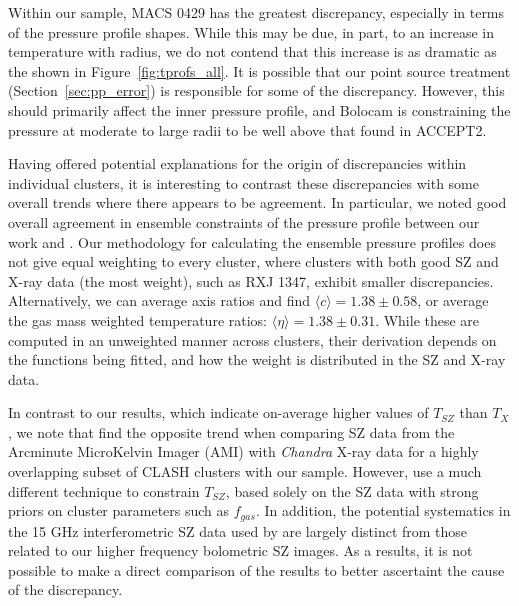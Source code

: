 \documentclass[iop,numberedappendix,apj]{emulateapj}
\begin{document}
Within our sample, MACS 0429 has the greatest discrepancy, especially in terms of the pressure profile shapes. While
this may be due, in part, to an increase in temperature with radius, we do not contend that this increase is as dramatic
as the shown in Figure~\ref{fig:tprofs_all}.
It is possible that our point source treatment (Section~\ref{sec:pp_error}) is responsible for some of the discrepancy. 
However, this should primarily affect the inner pressure profile, and Bolocam is constraining the pressure at moderate 
to large radii to be well above that found in ACCEPT2. 

Having offered potential explanations for the origin of discrepancies within individual clusters, it is interesting to
contrast these discrepancies with some overall trends where there appears to be agreement. In particular, we noted good 
overall agreement in ensemble constraints of the pressure profile between our work and . Our
methodology for calculating the ensemble pressure profiles does not give equal weighting to every cluster, where clusters
with both good SZ and X-ray data (the most weight), such as RXJ 1347, exhibit smaller discrepancies. Alternatively,
we can average axis ratios and find $\langle c \rangle = 1.38 \pm 0.58$, or average the gas mass weighted temperature 
ratios: $\langle \eta \rangle = 1.38 \pm 0.31$. While these are computed in an unweighted manner across clusters, their
derivation depends on the functions being fitted, and how the weight is distributed in the SZ and X-ray data. 

In contrast to our results, which indicate on-average higher values of $T_{SZ}$ than $T_{X}$, we note that \citet{rumsey2016}
find the opposite trend when comparing SZ data from the Arcminute MicroKelvin Imager (AMI) with \emph{Chandra} X-ray data for
a highly overlapping subset of CLASH clusters with our sample. However, \citet{rumsey2016} use a much different technique to
constrain $T_{SZ}$, based solely on the SZ data with strong priors on cluster parameters such as $f_{gas}$. In addition, the 
potential systematics in the 15 GHz interferometric SZ data used by \citet{rumsey2016} are largely distinct from those
related to our higher frequency bolometric SZ images. As a results, it is not possible to make a direct comparison of the
results to better ascertaint the cause of the discrepancy.
\end{document}
